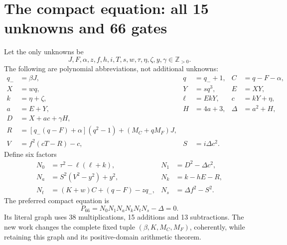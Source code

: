 \documentclass[10pt,letterpaper]{article}
\newcommand{\Pos}{\mathbb Z_{>0}}
\theoremstyle{remark}\newtheorem{remark}[theorem]{Remark}
\begin{document}
\section{The compact equation: all 15 unknowns and 66 gates}
\label{sec:compact}

Let the only unknowns be
\[
 J,F,\alpha,z,f,h,i,T,s,w,\tau,\eta,\zeta,y,\gamma\in\Pos.
\]
The following are polynomial abbreviations, not additional unknowns:
\begin{align*}
 q_-&=\beta J,&q&=q_-+1,& C&=q-F-\alpha,\\
 X&=wq,&Y&=sq^3,&E&=XY,\\
 k&=\eta+\zeta,&\ell&=EkY,&c&=kY+\eta,\\
 a&=E+Y,&H&=4a+3,&\Delta&=a^2+H,\\
 D&=X+ac+\gamma H,&&&\\[-2pt]
 R&=[q_-(q-F)+\alpha](q^2-1)+(M_C+qM_F)J,&&&\\
 V&=f^2(cT-R)-c,& S&=i\Delta c^2.&&
\end{align*}
Define six factors
\begin{align*}
 N_0&=\tau^2-\ell(\ell+k),&
 N_1&=D^2-\Delta c^2,\\
 N_a&=S^2(V^2-y^2)+y^2,&
 N_k&=k-hE-R,\\
 N_t&=(K+w)C+(q-F)-zq_-,&
 N_s&=\Delta f^2-S^2.
\end{align*}
The preferred compact equation is
\begin{equation}\label{eq:p66}
 \boxed{P_{66}=N_0N_1N_aN_kN_tN_s-\Delta=0.}
\end{equation}
Its literal graph uses 38 multiplications, 15 additions and 13 subtractions.
The new work changes the complete fixed tuple $(\beta,K,M_C,M_F)$, coherently,
while retaining this graph and its positive-domain arithmetic theorem.
\end{document}
